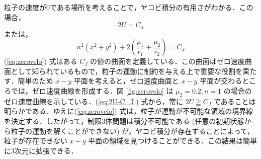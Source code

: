 \documentclass[11pt,a4paper,oneside,onecolumn]{jreport}
\begin{document}
粒子の速度が0である場所を考えることで，ヤコビ積分の有用さがわかる．この場合，
\begin{equation}
2 U = C_J
\end{equation}
または，
\begin{equation}
n^2 (x^2 + y^2) + 2 \left( \frac{\mu_1}{r_1} + \frac{\mu_2}{r_2} \right) = C_J \label{eq:zerovelo}
\end{equation}
(\ref{eq:zerovelo}) 式はある $C_J$ の値の曲面を定義している．この曲面はゼロ速度曲面として知られているもので，粒子の運動に制約を与える上で重要な役割を果たす．簡単のため $x-y$ 平面を考えると，ゼロ速度曲面と $x-y$ 平面が交わるところでは，ゼロ速度曲線を形成する．図 \ref{fig:zerovelo} は $\mu_2 = 0.2, n = 1$ の場合のゼロ速度曲線を示している．(\ref{eq:2U-C_J}) 式から，常に $2 U \geqq C_J$ であることは明らかである．ゆえに(\ref{eq:zerovelo}) 式は，粒子が運動が不可能な領域の境界線を決定する．したがって，制限3体問題は積分不可能である (任意の初期状態から粒子の運動を解くことができない) が，ヤコビ積分が存在することによって，粒子が存在できない $x-y$ 平面の領域を見つけることができる．この結果は簡単に3次元に拡張できる．
\end{document}
